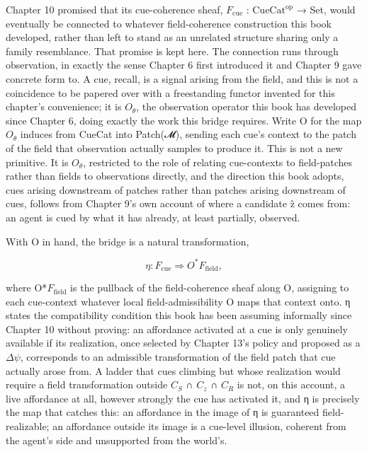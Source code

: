 Chapter 10 promised that its cue-coherence sheaf, \(F_{\mathrm{cue}}\) : \(\mathrm{CueCat}^{\mathrm{op}}\) → Set, would eventually be connected to whatever field-coherence construction this book developed, rather than left to stand as an unrelated structure sharing only a family resemblance. That promise is kept here. The connection runs through observation, in exactly the sense Chapter 6 first introduced it and Chapter 9 gave concrete form to. A cue, recall, is a signal arising from the field, and this is not a coincidence to be papered over with a freestanding functor invented for this chapter's convenience; it is \(O_\theta\), the observation operator this book has developed since Chapter 6, doing exactly the work this bridge requires. Write O for the map \(O_\theta\) induces from CueCat into Patch(𝓜), sending each cue's context to the patch of the field that observation actually samples to produce it. This is not a new primitive. It is \(O_\theta\), restricted to the role of relating cue-contexts to field-patches rather than fields to observations directly, and the direction this book adopts, cues arising downstream of patches rather than patches arising downstream of cues, follows from Chapter 9's own account of where a candidate ẑ comes from: an agent is cued by what it has already, at least partially, observed.

With O in hand, the bridge is a natural transformation,

\[ \eta : F_{\mathrm{cue}} \Rightarrow O^*F_{\mathrm{field}}, \]

where O*\(F_{\mathrm{field}}\) is the pullback of the field-coherence sheaf along O, assigning to each cue-context whatever local field-admissibility O maps that context onto. η states the compatibility condition this book has been assuming informally since Chapter 10 without proving: an affordance activated at a cue is only genuinely available if its realization, once selected by Chapter 13's policy and proposed as a \(\Delta\psi\), corresponds to an admissible transformation of the field patch that cue actually arose from. A ladder that cues climbing but whose realization would require a field transformation outside \(C_S\) ∩ \(C_z\) ∩ \(C_R\) is not, on this account, a live affordance at all, however strongly the cue has activated it, and η is precisely the map that catches this: an affordance in the image of η is guaranteed field-realizable; an affordance outside its image is a cue-level illusion, coherent from the agent's side and unsupported from the world's.

